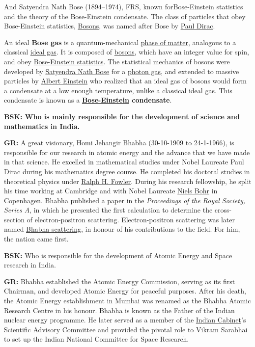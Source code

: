 And Satyendra Nath Bose (1894--1974), FRS, known for\break Bose-Einstein statistics and the theory of the Bose-Einstein condensate. The class of particles that obey Bose-Einstein statistics, \underline{Bosons}, was named after Bose by \underline{Paul Dirac}.

An ideal \textbf{Bose gas} is a quantum-mechanical \underline{phase of matter}, analogous to a classical \underline{ideal gas}. It is composed of \underline{bosons}, which have an integer value for spin, and obey \underline{Bose-Einstein statistics}. The statistical mechanics of bosons were developed by \underline{Satyendra Nath Bose} for a \underline{photon gas}, and extended to massive particles by \underline{Albert Einstein} who realized that an ideal gas of bosons would form a condensate at a low enough temperature, unlike a classical ideal gas. This condensate is known as a \textbf{\underline{Bose-Einstein} condensate}.

\textbf{BSK: Who is mainly responsible for the development of science and mathematics in India.}

\textbf{GR:}  A great visionary, Homi Jehangir Bhabha (30-10-1909 to 24-1-1966), is responsible for our research in atomic energy and the advance that we have made in that science. He excelled in mathematical studies under Nobel Laureate Paul Dirac during his mathematics degree course.  He completed his doctoral studies in theoretical physics under \underline{Ralph H. Fowler}. During his research fellowship, he split his time working at Cambridge and with Nobel Laureate \underline{Niels Bohr} in Copenhagen. Bhabha published a paper in the \textit{Proceedings of the Royal Society, Series A}, in which he presented the first calculation to determine the cross-section of electron-positron scattering. Electron-positron scattering was later named \underline{Bhabha scattering}, in honour of his contributions to the field. For him, the nation came first.
\vskip 1pt

\textbf{BSK:} Who is responsible for the development of Atomic Energy and Space research in India.
\vskip 1pt

\textbf{GR:} Bhabha established the Atomic Energy Commission, serving as its first Chairman, and developed Atomic Energy for peaceful purposes. After his death, the Atomic Energy establishment in Mumbai was renamed as the Bhabha Atomic Research Centre in his honour. Bhabha is known as the Father of the Indian nuclear energy programme. He later served as a member of the \underline{Indian Cabinet}'s Scientific Advisory Committee and provided the pivotal role to Vikram Sarabhai to set up the Indian National Committee for Space Research.
\vskip 1pt

